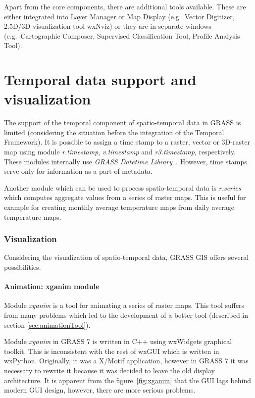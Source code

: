 \documentclass[a4paper,12pt,oneside]{book}
\newcommand{\module}[1]{\textsl{#1}}
\begin{document}
Apart from the core components, there are additional tools available.
These are either integrated into Layer Manager or Map Display
(e.g.\ Vector Digitizer, 2.5D/3D visualization tool wxNviz) or they are in separate windows
(e.g.\ Cartographic Composer, Supervised Classification Tool, Profile Analysis Tool).

\section{Temporal data support and visualization}
\label{sec:grassstate}
The support of the temporal component of spatio-temporal data in GRASS is limited
(considering the situation before the integration of the Temporal Framework).
It is possible to assign a time stamp to a raster, vector or 3D-raster map using module
\module{r.timestamp}, \module{v.timestamp} and \module{r3.timestamp}, respectively.
These modules internally use \emph{GRASS Datetime Library}~\cite{grassProgMan}.
However, time stamps serve only for information as a part of metadata.

Another module which can be used to process spatio-temporal data is \module{r.series}
which computes aggregate values from a series of raster maps. This is useful for example
for creating monthly average temperature maps from daily average temperature maps.

\subsubsection{Visualization}
\label{sec:grassVisualization}
Considering the visualization of spatio-temporal data, GRASS GIS offers
several possibilities.

\paragraph{Animation: xganim module} Module \module{xganim} is a tool for animating a series of raster maps.
This tool suffers from many problems which led to the development
of a better tool (described in section \ref{sec:animationTool}).

Module \module{xganim} in GRASS 7 is written in C++ using wxWidgets graphical toolkit.
This is inconsistent with the rest of wxGUI which is written in wxPython.
Originally, it was a X/Motif application, however in GRASS 7 it was necessary
to rewrite it because it was decided to leave the old display architecture.
It is apparent from the figure~\ref{fig:xganim} that the GUI lags behind modern GUI design,
however, there are more serious problems.
\end{document}
